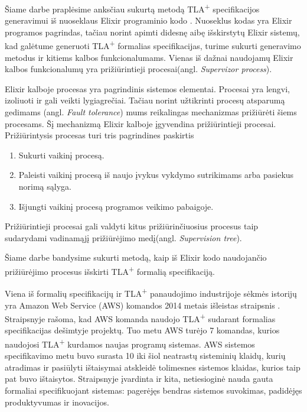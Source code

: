 \documentclass{VUMIFPSmagistrinis}
\begin{document}
        Šiame darbe praplėsime anksčiau sukurtą metodą TLA\textsuperscript{+} specifikacijos generavimui iš nuoseklaus Elixir programinio kodo \cite{bravzenas2023tla+}. 
        Nuoseklus kodas yra Elixir programos pagrindas, tačiau norint apimti didesnę aibę išskirstytų
        Elixir sistemų, kad galėtume generuoti TLA\textsuperscript{+} formalias specifikacijas, turime sukurti generavimo metodus ir kitiems kalbos funkcionalumams.
        Vienas iš dažnai naudojamų Elixir kalbos funkcionalumų yra prižiūrintieji procesai(angl. {\it Supervizor process}).
        
        Elixir kalboje procesas yra pagrindinis sistemos elementai.
        Procesai yra lengvi, izoliuoti ir gali veikti lygiagrečiai.
        Tačiau norint užtikrinti procesų atsparumą gedimams (angl. {\it Fault tolerance}) mums reikalingas mechanizmas prižiūrėti šiems procesams.
        Šį mechanizmą Elixir kalboje įgyvendina prižiūrintieji procesai.
        Prižiūrintysis procesas turi tris pagrindines paskirtis
        \begin{enumerate}
            \item {Sukurti vaikinį procesą.}
            \item {Paleisti vaikinį procesą iš naujo įvykus vykdymo sutrikimams arba pasiekus norimą sąlyga.}
            \item {Išjungti vaikinį procesą programos veikimo pabaigoje.}
        \end{enumerate}

        Prižiūrintieji procesai gali valdyti kitus prižiūrinčiuosius procesus taip sudarydami vadinamąjį
        prižiūrėjimo medį(angl. {\it Supervision tree}).

        Šiame darbe bandysime sukurti metodą, kaip iš Elixir kodo naudojančio prižiūrėjimo procesus išskirti TLA\textsuperscript{+} formalią specifikaciją.


		Viena iš formalių specifikacijų ir TLA\textsuperscript{+} panaudojimo industrijoje sėkmės istorijų yra Amazon Web Service (AWS) komandos 2014 metais išleistas straipsnis \cite{newcombe2014use}.
		Straipsnyje rašoma,  kad AWS komanda naudojo TLA\textsuperscript{+} sudarant formalias specifikacijas dešimtyje projektų. Tuo metu AWS turėjo 7 komandas, kurios naudojosi TLA\textsuperscript{+} kurdamos naujas programų sistemas.
		AWS sistemos specifikavimo metu buvo surasta 10 iki šiol neatrastų sisteminių klaidų, kurių atradimas ir pasiūlyti ištaisymai atskleidė tolimesnes sistemos klaidas, kurios taip pat buvo ištaisytos.
		Straipsnyje įvardinta ir kita, netiesioginė nauda gauta formaliai specifikuojant sistemas: pagerėjęs bendras sistemos suvokimas, padidėjęs produktyvumas ir inovacijos.
		
\end{document}
